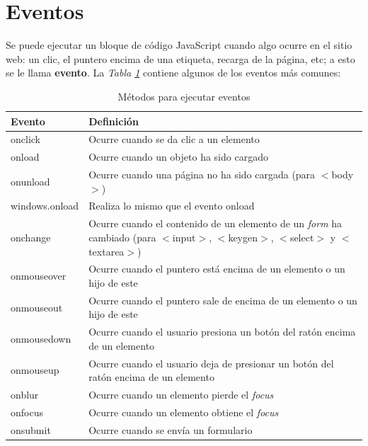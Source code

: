 \section{Eventos}
\hspace{0.55cm}Se puede ejecutar un bloque de código JavaScript cuando algo ocurre en el sitio web: un clic, el puntero encima de una etiqueta, recarga de la página, etc; a esto se le llama \textbf{evento}. La \textit{Tabla \ref{tab: 11}} contiene algunos de los eventos más comunes:
\begin{table}[H]
    \begin{center}
        \caption{Métodos para ejecutar eventos}
        \label{tab: 11}
        \begin{tabular}{m{3cm} m{10cm}}
            \hline
            \textbf{Evento} & \textbf{Definición} \\
            \hline
            onclick         & Ocurre cuando se da clic a un elemento \\
            onload          & Ocurre cuando un objeto ha sido cargado \\
            onunload        & Ocurre cuando una página no ha sido cargada (para $<$body$>$) \\
            windows.onload  & Realiza lo mismo que el evento onload \\
            onchange        & Ocurre cuando el contenido de un elemento de un \textit{form} ha cambiado (para $<$input$>$, $<$keygen$>$, $<$select$>$ y $<$textarea$>$) \\
            onmouseover     & Ocurre cuando el puntero está encima de un elemento o un hijo de este \\
            onmouseout      & Ocurre cuando el puntero sale de encima de un elemento o un hijo de este \\
            onmousedown     & Ocurre cuando el usuario presiona un botón del ratón encima de un elemento \\
            onmouseup       & Ocurre cuando el usuario deja de presionar un botón del ratón encima de un elemento \\
            onblur          & Ocurre cuando un elemento pierde el \textit{focus} \\
            onfocus         & Ocurre cuando un elemento obtiene el \textit{focus} \\
            onsubmit        & Ocurre cuando se envía un formulario \\
            \hline
        \end{tabular}
    \end{center}    
\end{table}


